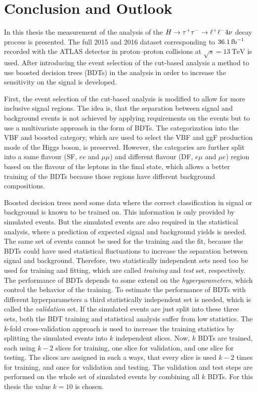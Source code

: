 \chapter{Conclusion and Outlook}\label{cha:conclusion}

In this thesis the measurement of the analysis of the $H \to \tau^+\tau^- \to \ell^+\ell^- 4\nu$ decay process is presented.
The full 2015 and 2016 dataset corresponding to $\SI{36.1}{\invfb}$ recorded with the ATLAS detector
in proton--proton collisions at $\sqrt{s} = \SI{13}{\TeV}$ is used.
After introducing the event selection of the cut-based analysis
a method to use boosted decision trees (BDTs) in the analysis in order to increase the sensitivity on the signal
is developed.

First, the event selection of the cut-based analysis is modified to allow for more inclusive signal regions.
The idea is, that the separation between signal and background events is not achieved by applying requirements on the
events but to use a multivariate approach in the form of BDTs.
The categorization into the VBF and boosted category, which are used to select the VBF and ggF production mode
of the Higgs boson, is preserved.
However, the categories are further split into a same flavour (SF, $ee$ and $\mu\mu$) and different flavour (DF, $e\mu$ and $\mu e$)
region based on the flavour of the leptons in the final state,
which allows a better training of the BDTs because those regions have different background compositions.

Boosted decision trees need some data where the correct classification in signal or background is known to be trained on.
This information is only provided by simulated events.
But the simulated events are also required in the statistical analysis, where a prediction of expected signal and background
yields is needed.
The same set of events cannot be used for the training and the fit, because the BDTs could have used statistical fluctuations
to increase the separation between signal and background.
Therefore, two statistically independent sets need too be used for training and fitting, which are called \emph{training} and \emph{test} set, respectively.
The performance of BDTs depends to some extend on the \emph{hyperparameters}, which control the behavior of the training.
To estimate the performance of BDTs with different hyperparameters a third statistically independent set is needed, which is called the \emph{validation}
set.
If the simulated events are just split into these three sets, both the BDT training and statistical analysis suffer from
low statistics.
The $k$-fold cross-validation approach is used to increase the training statistics by splitting the simulated events
into $k$ independent slices.
Now, $k$ BDTs are trained, each using $k-2$ slices for training, one slice for validation, and one slice for testing.
The slices are assigned in such a ways, that every slice is used $k-2$ times for training, and once for validation and testing.
The validation and test steps are performed on the whole set of simulated events by combining all $k$ BDTs.
For this thesis the value $k=10$ is chosen.

